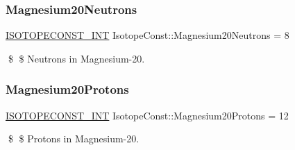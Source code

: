 \subsubsection{\texorpdfstring{Magnesium20\+Neutrons}{Magnesium20Neutrons}}
{\footnotesize\ttfamily \mbox{\hyperlink{group___isotope_const-_macros_ga5f18360b3e99483a35c32d789e62621c}{I\+S\+O\+T\+O\+P\+E\+C\+O\+N\+S\+T\+\_\+\+I\+NT}} Isotope\+Const\+::\+Magnesium20\+Neutrons = 8}

\$ \$ Neutrons in Magnesium-\/20. \mbox{\label{group___isotope_const-_magnesium-_mg20_ga06e2ea4189915ca6e30d308e3b39f8e8}} 
\subsubsection{\texorpdfstring{Magnesium20\+Protons}{Magnesium20Protons}}
{\footnotesize\ttfamily \mbox{\hyperlink{group___isotope_const-_macros_ga5f18360b3e99483a35c32d789e62621c}{I\+S\+O\+T\+O\+P\+E\+C\+O\+N\+S\+T\+\_\+\+I\+NT}} Isotope\+Const\+::\+Magnesium20\+Protons = 12}

\$ \$ Protons in Magnesium-\/20. 